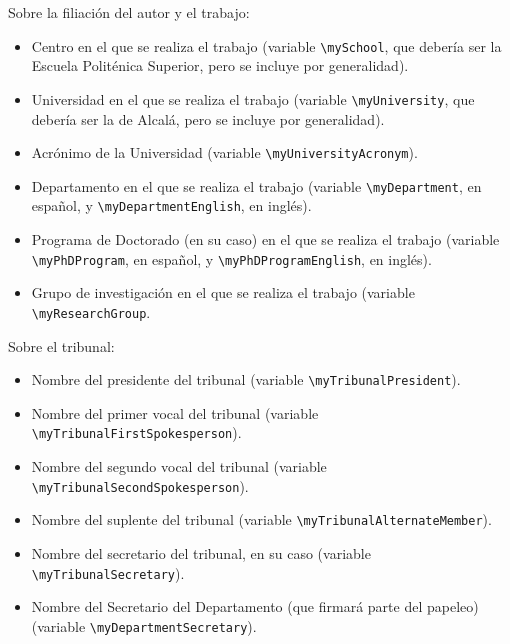 \documentclass[spanish,openright]{book}
\begin{document}
Sobre la filiación del autor y el trabajo:

\begin{itemize}

\item Centro en el que se realiza el trabajo (variable
\texttt{\textbackslash{}mySchool}, que debería ser la Escuela
Politénica Superior, pero se incluye por generalidad).
\item Universidad en el que se realiza el trabajo (variable
\texttt{\textbackslash{}myUniversity}, que debería ser la de
Alcalá, pero se incluye por generalidad).
\item Acrónimo de la Universidad (variable
\texttt{\textbackslash{}myUniversityAcronym}).

\item Departamento en el que se realiza el trabajo (variable
\texttt{\textbackslash{}myDepartment}, en español, y
\texttt{\textbackslash{}myDepartmentEnglish}, en inglés).

\item Programa de Doctorado (en su caso) en el que se realiza el
trabajo (variable \texttt{\textbackslash{}myPhDProgram}, en español,
y \texttt{\textbackslash{}myPhDProgramEnglish}, en inglés).
\item Grupo de investigación en el que se realiza el trabajo (variable
\texttt{\textbackslash{}myResearchGroup}.

\end{itemize}

Sobre el tribunal:

\begin{itemize}

\item Nombre del presidente del tribunal (variable
\texttt{\textbackslash{}myTribunalPresident}).
\item Nombre del primer vocal del tribunal (variable
\texttt{\textbackslash{}myTribunalFirstSpokesperson}).
\item Nombre del segundo vocal del tribunal (variable
\texttt{\textbackslash{}myTribunalSecondSpokesperson}).
\item Nombre del suplente del tribunal (variable
\texttt{\textbackslash{}myTribunalAlternateMember}).
\item Nombre del secretario del tribunal, en su caso (variable
\texttt{\textbackslash{}myTribunalSecretary}).
\item Nombre del Secretario del Departamento (que firmará parte del
papeleo) (variable \texttt{\textbackslash{}myDepartmentSecretary}).

\end{itemize}
\end{document}
